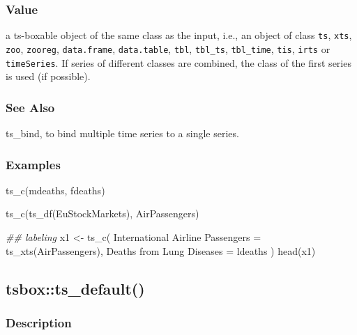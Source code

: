 \documentclass[
  letterpaper,
  DIV=11,
  numbers=noendperiod]{scrreport}
\newenvironment{Shaded}{\begin{snugshade}}{\end{snugshade}}
\newcommand{\AttributeTok}[1]{\textcolor[rgb]{0.40,0.45,0.13}{#1}}
\newcommand{\DocumentationTok}[1]{\textcolor[rgb]{0.37,0.37,0.37}{\textit{#1}}}
\newcommand{\FunctionTok}[1]{\textcolor[rgb]{0.28,0.35,0.67}{#1}}
\newcommand{\NormalTok}[1]{\textcolor[rgb]{0.00,0.23,0.31}{#1}}
\newcommand{\OtherTok}[1]{\textcolor[rgb]{0.00,0.23,0.31}{#1}}
\newcommand{\StringTok}[1]{\textcolor[rgb]{0.13,0.47,0.30}{#1}}
\begin{document}
\subsubsection{Value}\label{value-55}

a ts-boxable object of the same class as the input, i.e., an object of
class \texttt{ts}, \texttt{xts}, \texttt{zoo}, \texttt{zooreg},
\texttt{data.frame}, \texttt{data.table}, \texttt{tbl},
\texttt{tbl\_ts}, \texttt{tbl\_time}, \texttt{tis}, \texttt{irts} or
\texttt{timeSeries}. If series of different classes are combined, the
class of the first series is used (if possible).

\subsubsection{See Also}\label{see-also-2}

ts\_bind, to bind multiple time series to a single series.

\subsubsection{Examples}\label{examples-55}

\begin{Shaded}
\begin{Highlighting}[]
\FunctionTok{ts\_c}\NormalTok{(mdeaths, fdeaths)}

\FunctionTok{ts\_c}\NormalTok{(}\FunctionTok{ts\_df}\NormalTok{(EuStockMarkets), AirPassengers)}

\DocumentationTok{\#\# labeling}
\NormalTok{x1 }\OtherTok{\textless{}{-}} \FunctionTok{ts\_c}\NormalTok{(}
  \StringTok{\textasciigrave{}}\AttributeTok{International Airline Passengers}\StringTok{\textasciigrave{}} \OtherTok{=} \FunctionTok{ts\_xts}\NormalTok{(AirPassengers),}
  \StringTok{\textasciigrave{}}\AttributeTok{Deaths from Lung Diseases}\StringTok{\textasciigrave{}} \OtherTok{=}\NormalTok{ ldeaths}
\NormalTok{)}
\FunctionTok{head}\NormalTok{(x1)}
\end{Highlighting}
\end{Shaded}

\subsection{tsbox::ts\_default()}\label{tsboxts_default}

\subsubsection{Description}\label{description-56}
\end{document}
